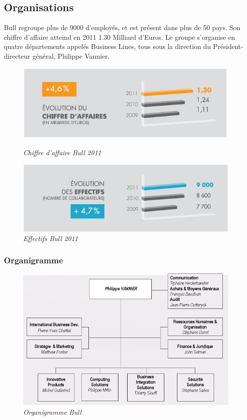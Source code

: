 \documentclass[11pt]{article}
\begin{document}
		\subsection{Organisations}
		Bull regroupe plus de 9000 d’employés, et est 
		présent dans plus de 50 pays. Son chiffre d'affaire atteind en 2011 1.30 Milliard d'Euros. Le groupe s'organise en 
		quatre départements appelés Business Lines, tous sous la direction du Président-directeur général, Philippe Vannier.
		\begin{figure}[h!]
		\begin{minipage}[b]{0.5\linewidth}
		\centering \includegraphics[scale=0.5]{profil2012_ca_fr.jpg}
		\caption{\it Chiffre d'affaire Bull 2011}
		\end{minipage}\hfill
		\begin{minipage}[b]{0.5\linewidth}
		\centering \includegraphics[scale=0.5]{profil2012_effectifs_fr.jpg}
		\caption{\it Effectifs Bull 2011}
		\end{minipage}
		\end{figure}
		\subsubsection{Organigramme}
		\begin{figure}[h!]
		\centering \includegraphics[scale=0.4]{organigramme.png}
		\caption{\it Organigramme Bull}
		\end{figure}
\end{document}
